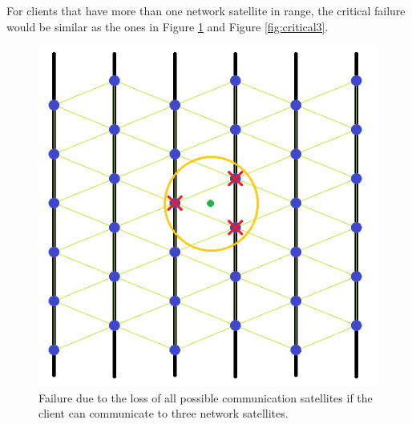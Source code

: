 For clients that have more than one network satellite in range, the critical failure would be similar as the ones in Figure \ref{fig:critical2} and Figure \ref{fig:critical3}. 
\begin{figure}[H]
\begin{center}
\includegraphics[scale=0.5]{./sections/Constellation_Deployment/S5-Spare_Strategy/critical2.png}
\caption[3 communication range failure]{Failure due to the loss of all possible communication satellites if the client can communicate to three network satellites.}
\label{fig:critical2}
\end{center}
\end{figure}

